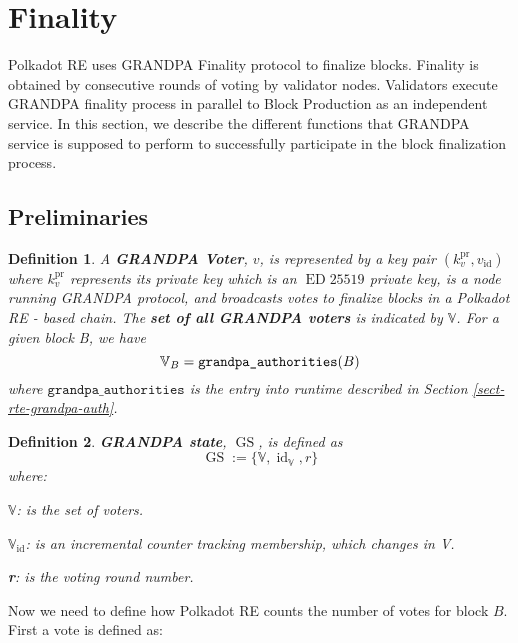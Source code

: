 \documentclass{book}
\newcommand{\assign}{:=}
\newcommand{\tmop}[1]{\ensuremath{\operatorname{#1}}}
\newcommand{\tmstrong}[1]{\textbf{#1}}
\newcommand{\tmtextbf}[1]{{\bfseries{#1}}}
\newcommand{\tmtexttt}[1]{{\ttfamily{#1}}}
\newcommand{\tmverbatim}[1]{{\ttfamily{#1}}}
\newtheorem{definition}{Definition}
\providecommand{\tmop}[1]{\ensuremath{\mathrm{#1}}}
\providecommand{\tmstrong}[1]{\tmtextbf{#1}}
\providecommand{\tmtextbf}[1]{\tmtextbf{#1}}
\providecommand{\tmverbatim}[1]{\tmtexttt{#1}}
\newtheorem{definition}{Definition}
\begin{document}
\section{Finality}\label{sect-finality}

Polkadot RE uses GRANDPA Finality protocol {\cite{stewart_grandpa:_2019}} to
finalize blocks. Finality is obtained by consecutive rounds of voting by
validator nodes. Validators execute GRANDPA finality process in parallel to
Block Production as an independent service. In this section, we describe the
different functions that GRANDPA service is supposed to perform to
successfully participate in the block finalization process.

\subsection{Preliminaries}

\begin{definition}
  A {\tmstrong{GRANDPA Voter}}, $v$, is represented by a key pair
  $(k^{\tmop{pr}}_v, v_{\tmop{id}})$ where $k_v^{\tmop{pr}}$ represents its
  private key which is an $\tmop{ED} 25519$ private key, is a node running
  GRANDPA protocol, and broadcasts votes to finalize blocks in a Polkadot RE -
  based chain. The {\tmstrong{set of all GRANDPA voters}} is indicated by
  $\mathbb{V}$. For a given block B, we have {}
  \[ \mathbb{V}_B = \text{\tmverbatim{grandpa\_authorities}} (B) \]
  where $\mathtt{grandpa\_authorities}$ is the entry into runtime described in
  Section \ref{sect-rte-grandpa-auth}.
\end{definition}

\begin{definition}
  {\tmstrong{GRANDPA state}}, $\tmop{GS}$, is defined as {}
  \[ \tmop{GS} \assign \{\mathbb{V}, \tmop{id}_{\mathbb{V}}, r\} \]
  where:
  
  $\mathbb{V}$: is the set of voters.
  
  {\tmstrong{$\mathbb{V}_{\tmop{id}}$}}: is an incremental counter tracking
  \tmverbatim{}membership, which changes in V.
  
  {\tmstrong{r}}: is the votin\tmverbatim{}g round number.
\end{definition}

Now we need to define how Polkadot RE counts the number of votes for block
$B$. First a vote is defined as:
\end{document}
